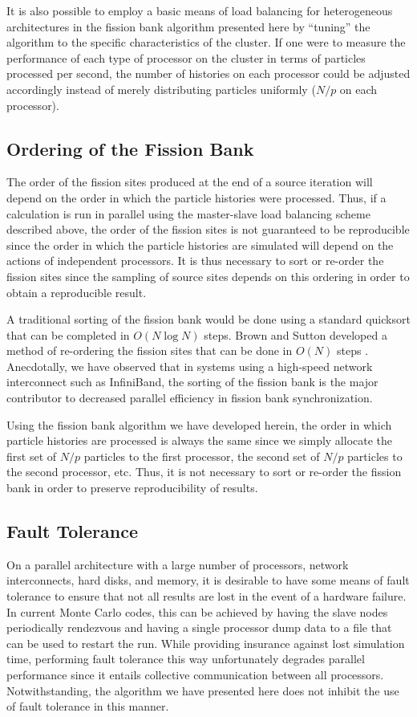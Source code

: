 \documentclass[11pt]{article}
\begin{document}
It is also possible to employ a basic means of load balancing for
heterogeneous architectures in the fission bank algorithm presented
here by ``tuning'' the algorithm to the specific characteristics of
the cluster. If one were to measure the performance of each type of
processor on the cluster in terms of particles processed per second,
the number of histories on each processor could be adjusted
accordingly instead of merely distributing particles uniformly ($N/p$
on each processor).

\subsection{Ordering of the Fission Bank}

The order of the fission sites produced at the end of a source
iteration will depend on the order in which the particle histories
were processed. Thus, if a calculation is run in parallel using the
master-slave load balancing scheme described above, the order of the
fission sites is not guaranteed to be reproducible since the order in
which the particle histories are simulated will depend on the actions
of independent processors. It is thus necessary to sort or re-order
the fission sites since the sampling of source sites depends on this
ordering in order to obtain a reproducible result.

A traditional sorting of the fission bank would be done using a
standard quicksort that can be completed in $O(N \log N)$ steps. Brown
and Sutton developed a method of re-ordering the fission sites that
can be done in $O(N)$ steps \cite{brown-sort}. Anecdotally, we have
observed that in systems using a high-speed network interconnect such
as InfiniBand, the sorting of the fission bank is the major
contributor to decreased parallel efficiency in fission bank
synchronization.

Using the fission bank algorithm we have developed herein, the order
in which particle histories are processed is always the same since we
simply allocate the first set of $N/p$ particles to the first
processor, the second set of $N/p$ particles to the second processor,
etc. Thus, it is not necessary to sort or re-order the fission bank in
order to preserve reproducibility of results.

\subsection{Fault Tolerance}

On a parallel architecture with a large number of processors, network
interconnects, hard disks, and memory, it is desirable to have some
means of fault tolerance to ensure that not all results are lost in
the event of a hardware failure. In current Monte Carlo codes, this
can be achieved by having the slave nodes periodically rendezvous and
having a single processor dump data to a file that can be used to
restart the run. While providing insurance against lost simulation
time, performing fault tolerance this way unfortunately degrades
parallel performance since it entails collective communication between
all processors. Notwithstanding, the algorithm we have presented here
does not inhibit the use of fault tolerance in this manner.
\end{document}
